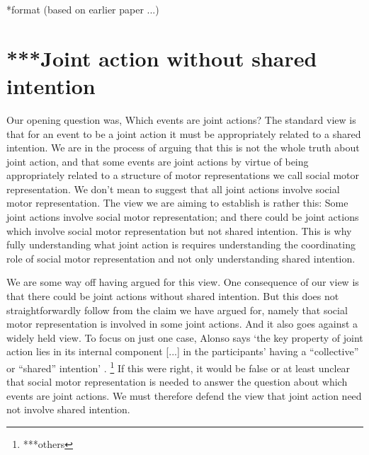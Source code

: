 \documentclass[12pt,\papersize]{extarticle}
\begin{document}
*format (based on earlier paper ...)



\section{***Joint action without shared intention}
Our opening question was, Which events are joint actions?
The standard view is that for an event to be a joint action it must be appropriately related to a shared intention.
We are in the process of arguing that this is not the whole truth about joint action,
and that some events are joint actions by virtue of being appropriately related to a structure of motor representations we call social motor representation.
We don’t mean to suggest that all joint actions involve social motor representation.
The view we are aiming to establish is rather this: Some joint actions involve social motor representation; and there could be joint actions which involve social motor representation but not shared intention.
This is why 
fully understanding what joint action is requires understanding the coordinating role of social motor representation and not only understanding shared intention.


We are some way off having argued for this view.
One consequence of our view is that there could be joint actions without shared intention. 
But this does not straightforwardly follow from the claim we have argued for, namely that social motor representation is involved in some joint actions.
And it also goes against a widely held view.
To focus on just one case, Alonso says `the key property of joint action lies in its internal component [...] in the participants' having a ``collective'' or ``shared'' intention' \citep[pp.\ 444-5]{alonso_shared_2009}.%
\footnote{
***others
}
If this were right, it would be false or at least unclear that social motor representation is needed to answer the question about which events are joint actions.
We must therefore defend the view that joint action need not involve shared intention.
\end{document}
